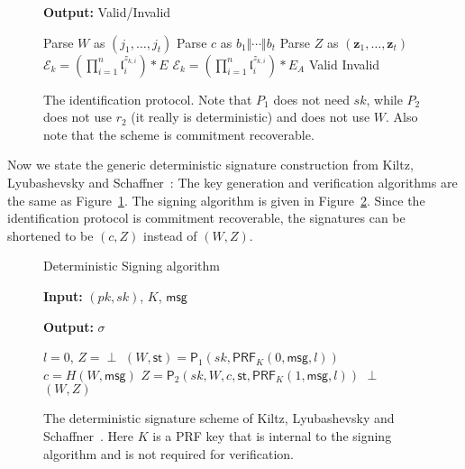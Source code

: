 \documentclass{llncs}
\newcommand{\E}{\mathcal{E}}
\newcommand{\msg}{\mathsf{msg}}
\renewcommand{\l}{\mathfrak{l}}
\newcommand{\z}{\mathbf{z}}
\newcommand{\PP}{\mathsf{P}}
\newcommand{\St}{\textsf{st}}
\newcommand{\PRF}{\mathsf{PRF}}
\begin{document}
\begin{figure}
\begin{minipage}{0.45\textwidth}
\begin{algorithm}[H]
	\textbf{Output:} Valid/Invalid

	\begin{algorithmic}[1]
		\State Parse $W$ as $(j_1 , \dots, j_t)$
		\State Parse $c$ as $b_1 \Vert \cdots \Vert b_t$
		\State Parse $Z$ as $(\z_1, \dots, \z_t)$
		\State $\E_k = ( \prod_{i=1}^n \l_i^{z_{k,i}} ) * E$
		\Else
		\State $\E_k = ( \prod_{i=1}^n \l_i^{z_{k,i}} ) * E_A$
		\EndIf
		\EndFor
		\If{$(j_1, \dots, j_t) = (j(\E_1) , \dots, j(\E_t))$} \State \Return Valid
		\Else \State \Return Invalid \EndIf
	\end{algorithmic}
\end{algorithm}
\end{minipage}
\caption{The identification protocol. Note that $P_1$ does not need $sk$, while $P_2$ does not use $r_2$ (it really is deterministic) and does not use $W$. Also note that the scheme is commitment recoverable. \label{fig:id-scheme}}
\end{figure}


Now we state the generic deterministic signature construction from Kiltz, Lyubashevsky and Schaffner~\cite{KLS18}:
The key generation and verification algorithms are the same as Figure~\ref{fig:id-scheme}. The signing algorithm is given in Figure~\ref{fig:sign}. 
Since the identification protocol is commitment recoverable, the signatures can be shortened to be $(c, Z )$ instead of $(W,Z)$.

\begin{figure}
\begin{algorithm}[H]
	\caption{Deterministic Signing algorithm}
	\textbf{Input:} $(pk,sk)$, $K$, $\msg$

	\textbf{Output:} $\sigma$

	\begin{algorithmic}[1]
		\State $l = 0$, $Z = \perp$
		\State $(W,\St) = \PP_1( sk, \PRF_K( 0, \msg, l ))$
		\State $c = H( W, \msg )$ 
		\State $Z = \PP_2( sk, W, c, \St, \PRF_K( 1, \msg, l ))$
		\EndWhile
		\State \Return $\perp$
		\Else
		\State \Return $(W,Z)$
		\EndIf
	\end{algorithmic}
\end{algorithm}
\caption{The deterministic signature scheme of Kiltz, Lyubashevsky and Schaffner~\cite{KLS18}. Here $K$ is a PRF key that is internal to the signing algorithm and is not required for verification. \label{fig:sign}}
\end{figure}
\end{document}
